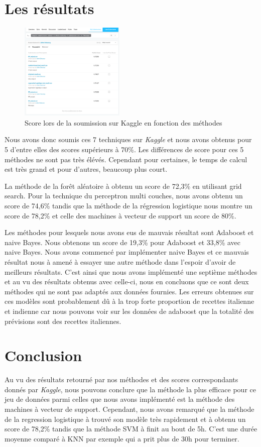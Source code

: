 \documentclass[12pt]{article}
\begin{document}
\newpage
\section{Les résultats}

\begin{figure}
	\includegraphics[width=5cm]{./soumission_kaggle.png}
	\caption{Score lors de la soumission sur Kaggle en fonction des méthodes}
\end{figure}
Nous avons donc soumis ces 7 techniques sur \textit{Kaggle} et nous avons obtenus pour 5 d'entre elles des scores supérieurs à 70\%. Les différences de score pour ces 5 méthodes ne sont pas très élévés. Cependant pour certaines, le temps de calcul est très grand et pour d'autres, beaucoup plus court.

La méthode de la forêt aléatoire à obtenu un score de 72,3\% en utilisant grid search. Pour la technique du perceptron multi couches, nous avons obtenu un score de 74,6\% tandis que la méthode de la régression logistique nous montre un score de 78,2\% et celle des machines à vecteur de support un score de 80\%.

Les méthodes pour lesquels nous avons eus de mauvais résultat sont Adaboost et naive Bayes. Nous obtenons un score de 19,3\% pour Adaboost et 33,8\% avec naive Bayes. Nous avons commencé par implémenter naive Bayes et ce mauvais résultat nous à amené à essayer une autre méthode dans l'espoir d'avoir de meilleurs résultats. C'est ainsi que nous avons implémenté une septième méthodes et au vu des résultats obtenus avec celle-ci, nous en concluons que ce sont deux méthodes qui ne sont pas adaptés aux données fournies. Les erreurs obtenues sur ces modèles sont probablement dû à la trop forte proportion de recettes italienne et indienne car nous pouvons voir sur les données de adaboost que la totalité des prévisions sont des recettes italiennes.


\section{Conclusion}
Au vu des résultats retourné par nos méthodes et des scores correspondants donnés par \textit{Kaggle}, nous pouvons conclure que la méthode la plus efficace pour ce jeu de données parmi celles que nous avons implémenté est la méthode des machines à vecteur de support. Cependant, nous avons remarqué que la méthode de la regression logistique à trouvé son modèle très rapidement et à obtenu un score de 78,2\% tandis que la méthode SVM à finit au bout de 5h. C'est une durée moyenne comparé à KNN par exemple qui a prit plus de 30h pour terminer.
\end{document}
